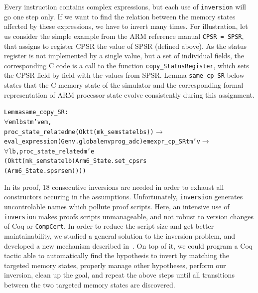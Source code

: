\documentclass{llncs}
\newcommand{\coqdockw}[1]{\texttt{#1}}
\newcommand{\inversion}{\coqdockw{inversion}\xspace}
\newcommand{\compcert}{\texttt{CompCert}\xspace}
\begin{document}
Every instruction contains complex expressions, but each use of
\inversion will go one step only.  If we want to find the relation
between the memory states affected by these expressions, we have to
invert many times. For illustration, let us consider the simple
example from the ARM reference manual \texttt{CPSR = SPSR}, that
assigns to register CPSR the value of SPSR (defined above).  As the
status register is not implemented by a single value, but a set of
individual fields, the corresponding C code is a call to the function
\texttt{copy\_StatusRegister}, which sets the CPSR field by field with
the values from SPSR.  Lemma \texttt{same\_cp\_SR} below states that
the C memory state of the simulator and the corresponding formal
representation of ARM processor state evolve consistently during this
assignment.
\begin{alltt}\small
Lemma same_copy_SR :
  \(\forall\) e m l b s t m' v em,
  proc_state_related m e (Ok tt (mk_semstate l b s)) \(\rightarrow\)
    eval_expression (Genv.globalenv prog_adc) e m expr_cp_SR t m' v  \(\rightarrow\)
    \(\forall\) l b, proc_state_related m' e
                      (Ok tt (mk_semstate l b (Arm6_State.set_cpsr s
                                              (Arm6_State.spsr s em))))
\end{alltt}
In its proof, 18 consecutive inversions are needed in order to exhaust
all constructors occuring in the assumptions.  Unfortunately,
\inversion generates uncontrolable names which pollute proof scripts.
Here, an intensive use of \inversion makes proofs scripts
unmanageable, and not robust to version changes of Coq or \compcert.
%
In order to reduce the script size and get better
maintainability, we studied a general solution to the inversion problem,
and developed a new mechanism described in~\cite{itp13}.
%
On top of it, we could program a Coq tactic able to
automatically find the hypothesis to invert by matching the targeted
memory states,
properly manage other hypotheses,
perform our inversion,
clean up the goal,
and repeat
the above steps until all transitions between the
two targeted memory states are discovered.
\end{document}
